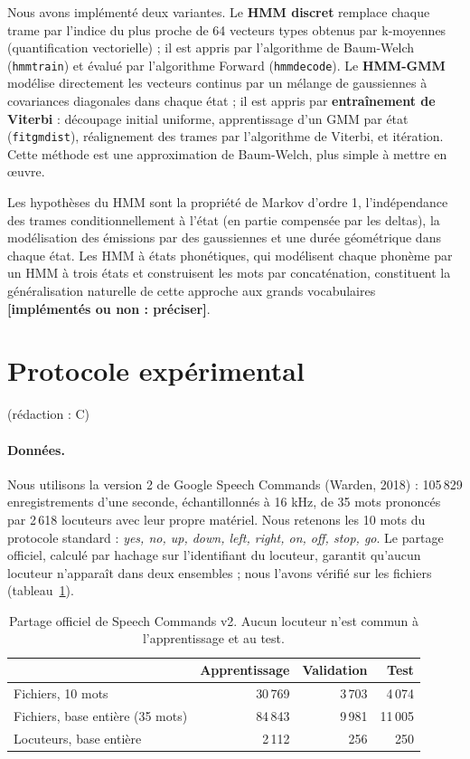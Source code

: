\documentclass[11pt,a4paper]{article}
\newcommand{\ar}[1]{\colorbox{jaune}{\textbf{\small [#1]}}}            %
\newcommand{\redaction}[1]{\hfill{\small\color{gray}(rédaction : #1)}}   %
\begin{document}
Nous avons implémenté deux variantes. Le \textbf{HMM discret} remplace chaque trame par l'indice du plus proche de 64 vecteurs types obtenus par k-moyennes (quantification vectorielle) ; il est appris par l'algorithme de Baum-Welch (\texttt{hmmtrain}) et évalué par l'algorithme Forward (\texttt{hmmdecode}). Le \textbf{HMM-GMM} modélise directement les vecteurs continus par un mélange de gaussiennes à covariances diagonales dans chaque état ; il est appris par \textbf{entraînement de Viterbi} : découpage initial uniforme, apprentissage d'un GMM par état (\texttt{fitgmdist}), réalignement des trames par l'algorithme de Viterbi, et itération. Cette méthode est une approximation de Baum-Welch, plus simple à mettre en œuvre.

Les hypothèses du HMM sont la propriété de Markov d'ordre 1, l'indépendance des trames conditionnellement à l'état (en partie compensée par les deltas), la modélisation des émissions par des gaussiennes et une durée géométrique dans chaque état. Les HMM à états phonétiques, qui modélisent chaque phonème par un HMM à trois états et construisent les mots par concaténation, constituent la généralisation naturelle de cette approche aux grands vocabulaires \ar{implémentés ou non : préciser}.

\section{Protocole expérimental}\label{sec:protocole}\redaction{C}

\paragraph{Données.} Nous utilisons la version 2 de Google Speech Commands (Warden, 2018) : 105\,829 enregistrements d'une seconde, échantillonnés à 16 kHz, de 35 mots prononcés par 2\,618 locuteurs avec leur propre matériel. Nous retenons les 10 mots du protocole standard : \emph{yes, no, up, down, left, right, on, off, stop, go}. Le partage officiel, calculé par hachage sur l'identifiant du locuteur, garantit qu'aucun locuteur n'apparaît dans deux ensembles ; nous l'avons vérifié sur les fichiers (tableau~\ref{tab:donnees}).

\begin{table}[H]\centering\small
\begin{tabular}{lrrr}
\toprule
 & Apprentissage & Validation & Test \\
\midrule
Fichiers, 10 mots & 30\,769 & 3\,703 & 4\,074 \\
Fichiers, base entière (35 mots) & 84\,843 & 9\,981 & 11\,005 \\
Locuteurs, base entière & 2\,112 & 256 & 250 \\
\bottomrule
\end{tabular}
\caption{Partage officiel de Speech Commands v2. Aucun locuteur n'est commun à l'apprentissage et au test.}\label{tab:donnees}
\end{table}
\end{document}
